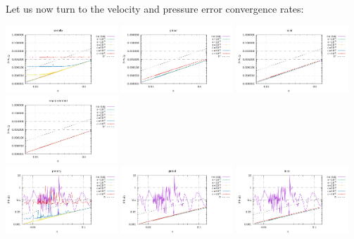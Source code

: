 Let us now turn to the velocity and pressure error convergence rates: 
\begin{center}
\includegraphics[width=4.21cm]{python_codes/fieldstone_115/results/dh/errorsV_penalty.pdf}
\includegraphics[width=4.21cm]{python_codes/fieldstone_115/results/dh/errorsV_global.pdf}
\includegraphics[width=4.21cm]{python_codes/fieldstone_115/results/dh/errorsV_local.pdf}
\includegraphics[width=4.21cm]{python_codes/fieldstone_115/results/dh/errorsV_macro.pdf}\\
\includegraphics[width=4.21cm]{python_codes/fieldstone_115/results/dh/errorsP_penalty.pdf}
\includegraphics[width=4.21cm]{python_codes/fieldstone_115/results/dh/errorsP_global.pdf}
\includegraphics[width=4.21cm]{python_codes/fieldstone_115/results/dh/errorsP_local.pdf}

\end{center}
